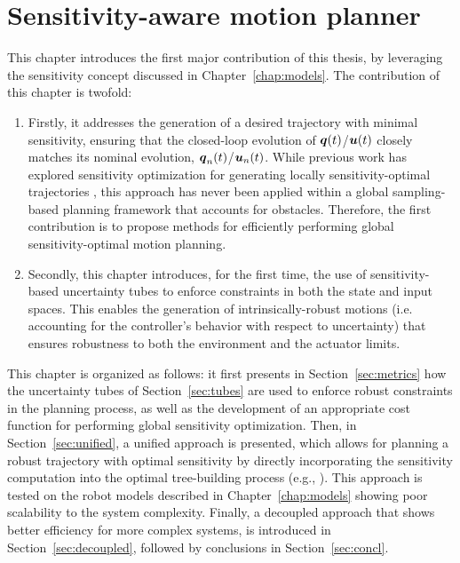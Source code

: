 \chapter{Sensitivity-aware motion planner}

This chapter introduces the first major contribution of this thesis, by leveraging the sensitivity concept discussed in Chapter~\ref{chap:models}.
The contribution of this chapter is twofold:
\begin{enumerate}
    \item Firstly, it addresses the generation of a desired trajectory with minimal sensitivity, ensuring that the closed-loop evolution of $\boldsymbol{q}(t)$/$\boldsymbol{u}(t)$ closely matches its nominal evolution, $\boldsymbol{q}_n(t)$/$\boldsymbol{u}_n(t)$. While previous work has explored sensitivity optimization for generating locally sensitivity-optimal trajectories \cite{cPi, cTh}, this approach has never been applied within a global sampling-based planning framework that accounts for obstacles. Therefore, the first contribution is to propose methods for efficiently performing global sensitivity-optimal motion planning.
    \item Secondly, this chapter introduces, for the first time, the use of sensitivity-based uncertainty tubes to enforce constraints in both the state and input spaces. This enables the generation of intrinsically-robust motions (i.e. accounting for the controller's behavior with respect to uncertainty) that ensures robustness to both the environment and the actuator limits.
\end{enumerate}
This chapter is organized as follows: it first presents in Section~\ref{sec:metrics} how the uncertainty tubes of Section~\ref{sec:tubes} are used to enforce robust constraints in the planning process, as well as the development of an appropriate cost function for performing global sensitivity optimization.
Then, in Section~\ref{sec:unified}, a unified approach is presented, which allows for planning a robust trajectory with optimal sensitivity by directly incorporating the sensitivity computation into the optimal tree-building process (e.g., ). 
This approach is tested on the robot models described in Chapter~\ref{chap:models} showing poor scalability to the system complexity.
Finally, a decoupled approach that shows better efficiency for more complex systems, is introduced in Section~\ref{sec:decoupled}, followed by conclusions in Section~\ref{sec:concl}.


